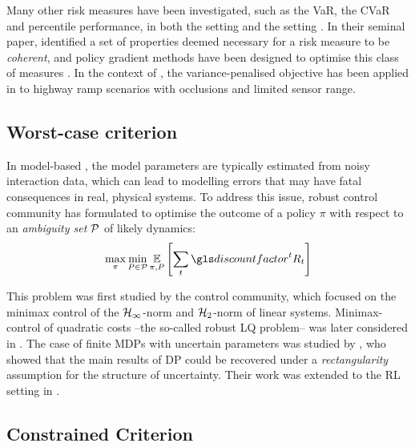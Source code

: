 Many other risk measures have been investigated, such as the \gls{VaR}, the \gls{CVaR} and percentile performance, in both the  setting \citet{Torossian19a} and the  setting \citep{Moody2001,Tamar2012,Prashanth2013,Delage2010}. In their seminal paper, \citet{Artzner1999} identified a set of properties deemed necessary for a risk measure to be \emph{coherent}, and policy gradient methods have been designed to optimise this class of measures \citep{Tamar2015}.
In the context of , the variance-penalised objective has been applied in \eg \citep{Naghshvar2018} to highway ramp scenarios with occlusions and limited sensor range.

\subsection{Worst-case criterion}

In model-based , the model parameters are typically estimated from noisy interaction data, which can lead to modelling errors that may have fatal consequences in real, physical systems. To address this issue, robust control community has formulated to optimise the outcome of a policy $\pi$ with respect to an \emph{ambiguity set} $\mathcal{P}$ of likely dynamics:
\begin{equation*}
\max_\pi \min_{P\in\cP} \expectedvalue_{\pi, P} \left[\sum_t \discount^t R_t\right]
\end{equation*}

This problem was first studied by the control community, which focused on the minimax control of the $\mathcal{H}_\infty$-norm \citep[][]{Basar1996} and $\mathcal{H}_2$-norm \citep{Berkenkamp2015} of linear systems. Minimax-control of quadratic costs --the so-called robust \gls{LQ} problem-- was later considered in \citep{abbasi-yadkori11a,Ibrahimi2013,Faradonbeh2020,Ouyang2017,abeille18a,Dean2019,Dean2018}.
The case of finite \glspl{MDP} with uncertain parameters was studied by \citet{Iyengar2005,Nilim2005,Wiesemann2013}, who showed that the main results of \gls{DP} could be recovered under a \emph{rectangularity} assumption for the structure of uncertainty. Their work was extended to the \gls{RL} setting in \citep{Tamar2014}.


\subsection{Constrained Criterion}
\label{sec:constrained-criterion}

